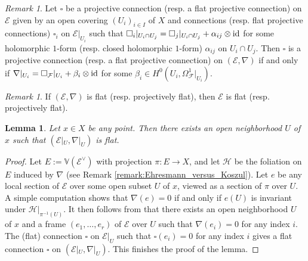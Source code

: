 \documentclass[english,10pt]{amsart}
\newcommand{\cF}{\mathcal{F}}
\newcommand{\cH}{\mathcal{H}}
\newcommand{\sE}{\mathscr{E}}
\newtheorem{lemma}[thm]{Lemma}
\theoremstyle{definition}
\theoremstyle{remark}
\newtheorem{rem}[thm]{Remark}
\numberwithin{equation}{section}
\begin{document}
\begin{rem}\label{remark:projective_connection_foliated_vb}
Let $\square$ be a projective connection (resp. a flat projective connection) on $\sE$ given by 
an open covering $(U_i)_{i\in I}$ of $X$ and connections (resp. flat projective connections) $\square_i$ on $\sE|_{U_i}$ such that $\square_i|_{U_i\cap U_j}=\square_j|_{U_i\cap U_j}+\alpha_{ij}\otimes \textup{id}$ for some holomorphic $1$-form (resp. closed holomorphic $1$-form) $\alpha_{ij}$ on $U_i\cap U_j$. Then $\square$ is 
a projective connection (resp. a flat projective connection) on $(\sE,\nabla)$ if and only if 
$\nabla|_{U_i}= {\square_\cF}|_{U_i}+\beta_i \otimes \textup{id}$ for some $\beta_i\in H^0\left(U_i,\Omega_\cF^1|_{U_i}\right)$.
\end{rem}

\begin{rem}
If $(\sE,\nabla)$ is flat (resp. projectively flat), then $\sE$ is flat (resp. projectively flat). 
\end{rem}

\begin{lemma}\label{lemma:existence_horizontal_sections}
Let $x \in X$ be any point. Then there exists an open neighborhood $U$ of $x$ such that 
$(\sE|_U,\nabla|_U)$ is flat.
\end{lemma}

\begin{proof}
Let $E:=\mathbb{V}(\sE^\vee)$ with projection $\pi\colon E \to X$, and let $\cH$ be the foliation on $E$ induced by $\nabla$ (see Remark \ref{remark:Ehresmann_versus_Koszul}). Let $e$ be any local section of $\sE$ over some open subset $U$ of $x$, viewed as a section of $\pi$ over $U$. A simple computation shows that $\nabla(e)=0$ if and only if $e(U)$ is invariant under $\cH|_{\pi^{-1}(U)}$. It then follows from \cite[Proposition 2.7]{molino} that there exists an open neighborhood $U$ of $x$ and a frame $(e_1,\ldots,e_r)$ of $\sE$ over $U$ such that $\nabla(e_i)=0$ for any index $i$. The (flat) connection $\square$ on $\sE|_U$ such that $\square(e_i)=0$ for any index $i$ gives a flat connection $\square$ on $(\sE|_U,\nabla|_U)$. This finishes the proof of the lemma.
\end{proof}
\end{document}
